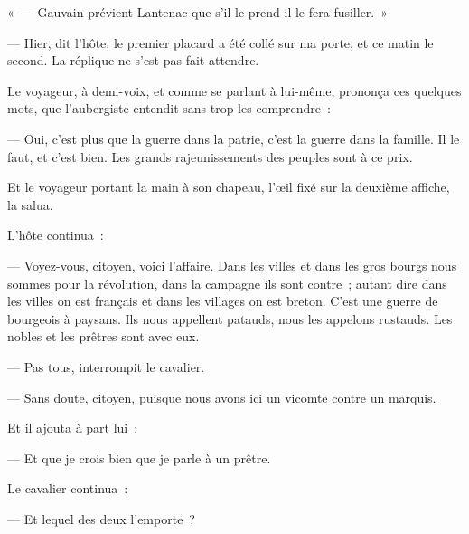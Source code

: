 \documentclass[french,twoside]{book} %
\begin{document}
« — Gauvain prévient Lantenac que s’il le prend il le fera fusiller. »\par
— Hier, dit l’hôte, le premier placard a été collé sur ma porte, et ce matin le second. La réplique ne s’est pas fait attendre.\par
Le voyageur, à demi-voix, et comme se parlant à lui-même, prononça ces quelques mots, que l’aubergiste entendit sans trop les comprendre :\par
— Oui, c’est plus que la guerre dans la patrie, c’est la guerre dans la famille. Il le faut, et c’est bien.  Les grands rajeunissements des peuples sont à ce prix.\par
Et le voyageur portant la main à son chapeau, l’œil fixé sur la deuxième affiche, la salua.\par
L’hôte continua :\par
— Voyez-vous, citoyen, voici l’affaire. Dans les villes et dans les gros bourgs nous sommes pour la révolution, dans la campagne ils sont contre ; autant dire dans les villes on est français et dans les villages on est breton. C’est une guerre de bourgeois à paysans. Ils nous appellent patauds, nous les appelons rustauds. Les nobles et les prêtres sont avec eux.\par
— Pas tous, interrompit le cavalier.\par
— Sans doute, citoyen, puisque nous avons ici un vicomte contre un marquis.\par
Et il ajouta à part lui :\par
— Et que je crois bien que je parle à un prêtre.\par
Le cavalier continua :\par
— Et lequel des deux l’emporte ?\par
\end{document}
